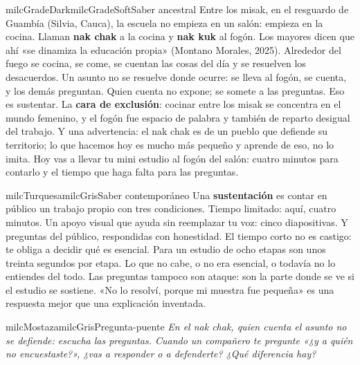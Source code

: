 \documentclass[11pt,letterpaper]{article}
\begin{document}
\begin{softbox}{milcGradeDark}{milcGradeSoft}{Saber ancestral}
Entre los misak, en el resguardo de Guambía (Silvia, Cauca), la escuela no empieza en un salón: empieza en la cocina. Llaman \textbf{nak chak} a la cocina y \textbf{nak kuk} al fogón. Los mayores dicen que ahí «se dinamiza la educación propia» (Montano Morales, 2025). Alrededor del fuego se cocina, se come, se cuentan las cosas del día y se resuelven los desacuerdos. Un asunto no se resuelve donde ocurre: se lleva al fogón, se cuenta, y los demás preguntan. Quien cuenta no expone; se somete a las preguntas. Eso es sustentar. La \textbf{cara de exclusión}: cocinar entre los misak se concentra en el mundo femenino, y el fogón fue espacio de palabra y también de reparto desigual del trabajo. Y una advertencia: el nak chak es de un pueblo que defiende su territorio; lo que hacemos hoy es mucho más pequeño y aprende de eso, no lo imita. Hoy vas a llevar tu mini estudio al fogón del salón: cuatro minutos para contarlo y el tiempo que haga falta para las preguntas.\par{}
\end{softbox}

\begin{softbox}{milcTurquesa}{milcGris}{Saber contemporáneo}
Una \textbf{sustentación} es contar en público un trabajo propio con tres condiciones. Tiempo limitado: aquí, cuatro minutos. Un apoyo visual que ayuda sin reemplazar tu voz: cinco diapositivas. Y preguntas del público, respondidas con honestidad. El tiempo corto no es castigo: te obliga a decidir qué es esencial. Para un estudio de ocho etapas son unos treinta segundos por etapa. Lo que no cabe, o no era esencial, o todavía no lo entiendes del todo. Las preguntas tampoco son ataque: son la parte donde se ve si el estudio se sostiene. «No lo resolví, porque mi muestra fue pequeña» es una respuesta mejor que una explicación inventada.
\end{softbox}

\begin{softbox}{milcMostaza}{milcGris}{Pregunta-puente}
\textit{En el nak chak, quien cuenta el asunto no se defiende: escucha las preguntas. Cuando un compañero te pregunte «¿y a quién no encuestaste?», ¿vas a responder o a defenderte? ¿Qué diferencia hay?}
\end{softbox}
\end{document}
